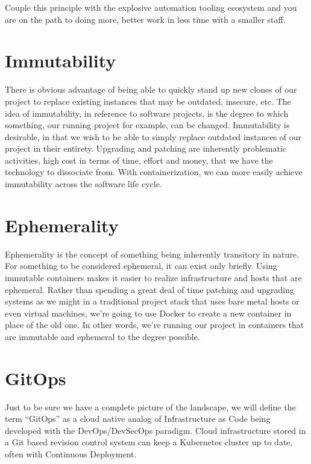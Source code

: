 \justify{}
Couple this principle with the explosive automation tooling ecosystem and you are on the path to doing more, better work in
less time with a smaller staff.

\section{Immutability}

\justify{}
There is obvious advantage of being able to quickly stand up new clones of our project to replace existing instances that
may be outdated, insecure, etc. The idea of immutability, in reference to software projects, is the degree to which something, 
our running project for example, can be changed. Immutability is desirable, in that we wish to be able to
simply replace outdated instances of our project in their entirety. Upgrading and patching are inherently
problematic activities, high cost in terms of time, effort and money, that we have the technology to dissociate from. With
containerization, we can more easily achieve immutability across the software life cycle.

\section{Ephemerality}

\justify{}
Ephemerality is the concept of something being inherently transitory in nature. For something to be
considered ephemeral, it can exist only briefly. Using immutable containers makes it easier to realize
infrastructure and hosts that are ephemeral. Rather than spending a great deal of time patching and upgrading systems as
we might in a traditional project stack that uses bare metal hosts or even virtual machines, we're going to
use Docker to create a new container in place of the old one. In other words, we're running our project in containers that
are immutable and ephemeral to the degree possible.

\section{GitOps}

\justify{}
Just to be sure we have a complete picture of the landscape, we will define the term ``GitOps'' as a
cloud native analog of Infrastructure as Code being developed with the DevOps/DevSecOps paradigm. Cloud infrastructure
stored in a Git based revision control system can keep a Kubernetes cluster up to date, often with Continuous Deployment.

